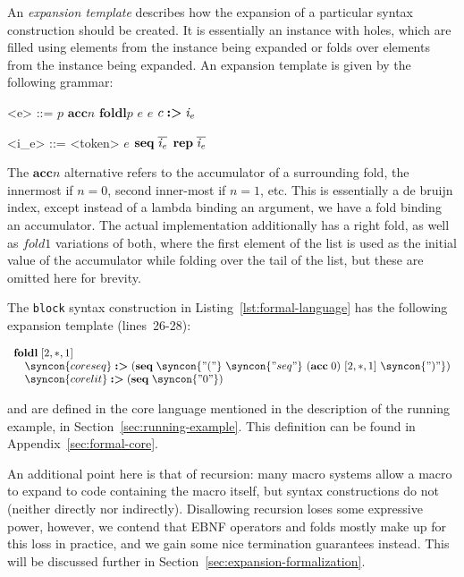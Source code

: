 \documentclass{kththesis}
\newcommand{\ssynt}[1]{\ensuremath{\mathit{#1}}}
\newenvironment{sgrammar}{\begin{grammar}\renewcommand{\grammarlabel}[2]{\ssynt{##1} \hfill##2}}{\end{grammar}}
\begin{document}
An \emph{expansion template} describes how the expansion of a particular syntax construction should be created. It is essentially an instance with holes, which are filled using elements from the instance being expanded or folds over elements from the instance being expanded. An expansion template is given by the following grammar:

\newcommand{\acc}{\mathrel{\mathbf{acc}}}
\newcommand{\foldl}{\mathrel{\mathbf{foldl}}}

\setlength{\grammarindent}{3em}
\begin{sgrammar}
<e> ::= $p$
  \alt $\acc n$
  \alt $\foldl p$ \ssynt{e} \ssynt{e}
  \alt $c \tagged \ssynt{i_e}$

<i_e> ::= <token>
  \alt \ssynt{e}
  \alt $\seq \overline{\ssynt{i_e}}$
  \alt $\repseq \overline{\ssynt{i_e}}$
\end{sgrammar}

The $\acc n$ alternative refers to the accumulator of a surrounding fold, the innermost if $n = 0$, second inner-most if $n = 1$, etc. This is essentially a de bruijn index, except instead of a lambda binding an argument, we have a fold binding an accumulator. The actual implementation additionally has a right fold, as well as $\mathit{fold1}$ variations of both, where the first element of the list is used as the initial value of the accumulator while folding over the tail of the list, but these are omitted here for brevity.

The \texttt{block} syntax construction in Listing~\ref{lst:formal-language} has the following expansion template (lines~26-28):

$$
\begin{array}{l}
\foldl [2, *, 1] \\
\quad \syncon{coreseq} \tagged (\seq \syncon{"("}\ \syncon{"seq"}\ (\acc 0)\ [2, *, 1]\ \syncon{")"}) \\
\quad \syncon{corelit} \tagged (\seq \syncon{"0"}) \\
\end{array}
$$

 and  are defined in the core language mentioned in the description of the running example, in Section~\ref{sec:running-example}. This definition can be found in Appendix~\ref{sec:formal-core}.

An additional point here is that of recursion: many macro systems allow a macro to expand to code containing the macro itself, but syntax constructions do not (neither directly nor indirectly). Disallowing recursion loses some expressive power, however, we contend that EBNF operators and folds mostly make up for this loss in practice, and we gain some nice termination guarantees instead. This will be discussed further in Section~\ref{sec:expansion-formalization}.
\end{document}
